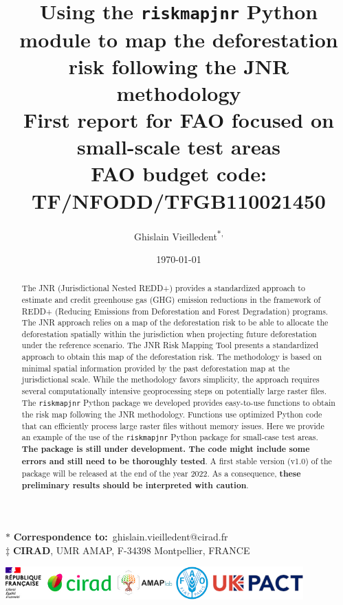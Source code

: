 \documentclass[paper=a4, 12pt, DIV=12]{scrartcl}
\author{Ghislain Vieilledent\textsuperscript{\(\ast\), \ddag{}}}
\date{\today}
\title{Using the \texttt{riskmapjnr} Python module to map the deforestation risk following the JNR methodology\\\medskip
\large \textcolor{pnasblue}{First report for FAO focused on small-scale test areas\\ FAO budget code: TF/NFODD/TFGB110021450}}
\begin{document}
\maketitle

\vspace{-1cm}
\begin{center}
  $\ast$ \textbf{Correspondence to:}~ghislain.vieilledent@cirad.fr \\
  $\ddag$ \textbf{CIRAD}, UMR AMAP, F-34398 Montpellier, FRANCE \\
\end{center}
\vspace{0.25cm}

\begin{abstract}
The JNR (Jurisdictional Nested REDD+) provides a standardized approach to estimate and credit greenhouse gas (GHG) emission reductions in the framework of REDD+ (Reducing Emissions from Deforestation and Forest Degradation) programs. The JNR approach relies on a map of the deforestation risk to be able to allocate the deforestation spatially within the jurisdiction when projecting future deforestation under the reference scenario. The JNR Risk Mapping Tool presents a standardized approach to obtain this map of the deforestation risk. The methodology is based on minimal spatial information provided by the past deforestation map at the jurisdictional scale. While the methodology favors simplicity, the approach requires several computationally intensive geoprocessing steps on potentially large raster files. The \texttt{riskmapjnr} Python package we developed provides easy-to-use functions to obtain the risk map following the JNR methodology. Functions use optimized Python code that can efficiently process large raster files without memory issues. Here we provide an example of the use of the \texttt{riskmapjnr} Python package for small-case test areas. \textbf{The package is still under development. The code might include some errors and still need to be thoroughly tested}. A first stable version (v1.0) of the package will be released at the end of the year 2022. As a consequence, \textbf{these preliminary results should be interpreted with caution}.
\end{abstract}

\vspace{0.25cm}
\begin{center}
\includegraphics[width=0.86\textwidth]{images/partners_logos.png}\enlargethispage{2\baselineskip}
\end{center}
\newpage
\tableofcontents
\newpage
\listoffigures
\newpage
\end{document}
